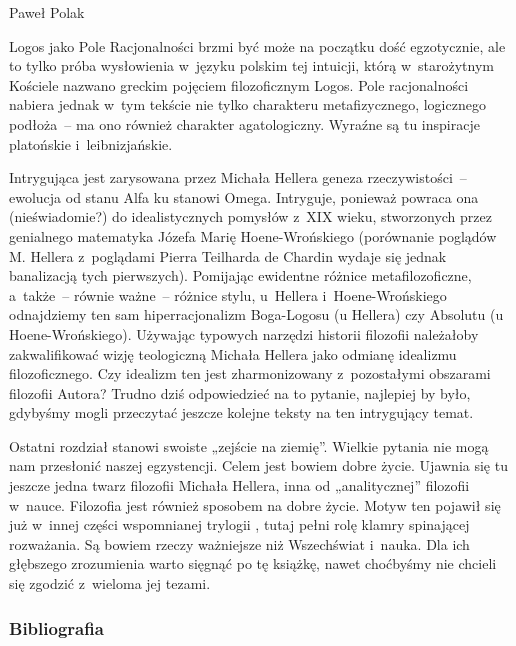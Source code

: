 \begin{recplenv}{Paweł Polak}

Logos jako Pole Racjonalności brzmi być może na początku dość egzotycznie, ale to tylko próba wysłowienia w~języku
polskim tej intuicji, którą w~starożytnym Kościele nazwano greckim pojęciem filozoficznym Logos. Pole racjonalności
nabiera jednak w~tym tekście nie tylko charakteru metafizycznego, logicznego podłoża~-- ma ono również charakter
agatologiczny. Wyraźne są tu inspiracje platońskie i~lei\-bnizjańskie.

Intrygująca jest zarysowana przez Michała Hellera geneza rzeczywistości~-- ewolucja od stanu Alfa ku stanowi Omega.
Intryguje, ponieważ powraca ona (nieświadomie?) do idealistycznych pomysłów z~XIX wieku, stworzonych przez genialnego
matematyka Józefa Marię Hoene-Wrońskiego (porównanie poglądów M. Hellera z~poglądami Pierra Teilharda de Chardin wydaje
się jednak banalizacją tych pierwszych). Pomijając ewidentne różnice metafilozoficzne, a~także~-- równie ważne~-- różnice
stylu, u~Hellera i~Hoene-Wrońskiego odnajdziemy ten sam hiperracjonalizm Boga-Logosu (u Hellera) czy Absolutu
(u Hoene-Wrońskiego). Używając typowych narzędzi historii filozofii należałoby zakwalifikować wizję teologiczną Michała
Hellera jako odmianę idealizmu filozoficznego. Czy idealizm ten jest zharmonizowany z~pozostałymi obszarami filozofii
Autora? Trudno dziś odpowiedzieć na to pytanie, najlepiej by było, gdybyśmy mogli przeczytać jeszcze kolejne teksty na
ten intrygujący temat.

Ostatni rozdział stanowi swoiste „zejście na ziemię”. Wielkie pytania nie mogą nam przesłonić naszej egzystencji.
Celem jest bowiem dobre życie. Ujawnia się tu jeszcze jedna twarz filozofii Michała Hellera, inna od „analitycznej”
filozofii w~nauce. Filozofia jest również sposobem na dobre życie. Motyw ten pojawił się już w~innej części wspomnianej
trylogii
\parencite{heller_jak_2009},
tutaj pełni rolę klamry spinającej rozważania. Są bowiem rzeczy ważniejsze niż Wszechświat i~nauka.
Dla ich głębszego zrozumienia warto sięgnąć po tę książkę, nawet choćbyśmy nie chcieli się zgodzić z~wieloma jej
tezami.




\subsubsection{Bibliografia}\nopagebreak[4]
\end{recplenv}
